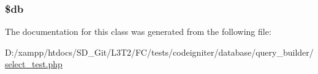 \subsubsection[{\$db}]{\setlength{\rightskip}{0pt plus 5cm}\$db\hspace{0.3cm}{\ttfamily [protected]}}\label{class_select__test_a1fa3127fc82f96b1436d871ef02be319}


The documentation for this class was generated from the following file\+:\begin{DoxyCompactItemize}
\item 
D\+:/xampp/htdocs/\+S\+D\+\_\+\+Git/\+L3\+T2/\+F\+C/tests/codeigniter/database/query\+\_\+builder/\hyperlink{select__test_8php}{select\+\_\+test.\+php}\end{DoxyCompactItemize}
